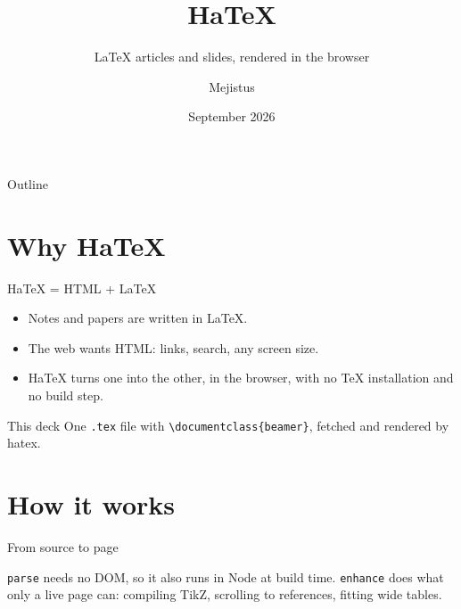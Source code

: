 \documentclass[aspectratio=169]{beamer}
\title{HaTeX}
\subtitle{\LaTeX{} articles and slides, rendered in the browser}
\author{Mejistus}
\date{September 2026}
\begin{document}
\begin{frame}
  \titlepage
\end{frame}

\begin{frame}{Outline}
  \tableofcontents
\end{frame}

\section{Why HaTeX}
\begin{frame}{HaTeX = HTML + \LaTeX}
  \begin{itemize}
    \item<1-> Notes and papers are written in \LaTeX.
    \item<2-> The web wants HTML: links, search, any screen size.
    \item<3-> HaTeX turns one into the other, in the browser, with no TeX installation and no build step.
  \end{itemize}
  \begin{exampleblock}{This deck}
    One \texttt{.tex} file with \verb|\documentclass{beamer}|, fetched and rendered by hatex.
  \end{exampleblock}
\end{frame}

\section{How it works}
\begin{frame}{From source to page}
  \begin{center}
  \end{center}
  \texttt{parse} needs no DOM, so it also runs in Node at build time.
  \texttt{enhance} does what only a live page can: compiling TikZ, scrolling to references, fitting wide tables.
\end{frame}
\end{document}
